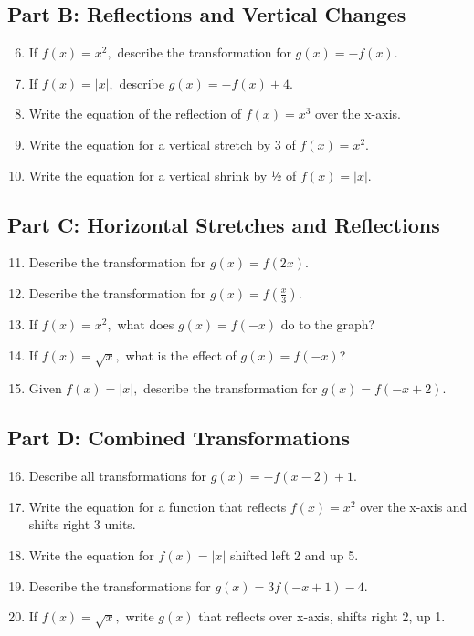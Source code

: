 \documentclass[12pt]{article}
\begin{document}
\subsection*{Part B: Reflections and Vertical Changes}
\begin{enumerate}
  \setcounter{enumi}{5}
  \item If \(f(x) = x^2,\) describe the transformation for \(g(x) = -f(x).\)
  \item If \(f(x) = |x|,\) describe \(g(x) = -f(x) + 4.\)
  \item Write the equation of the reflection of \(f(x) = x^3\) over the x-axis.
  \item Write the equation for a vertical stretch by 3 of \(f(x) = x^2.\)
  \item Write the equation for a vertical shrink by ½ of \(f(x) = |x|.\)
\end{enumerate}

\subsection*{Part C: Horizontal Stretches and Reflections}
\begin{enumerate}
  \setcounter{enumi}{10}
  \item Describe the transformation for \(g(x) = f(2x)\).
  \item Describe the transformation for \(g(x) = f\left(\frac{x}{3}\right)\).
  \item If \(f(x) = x^2,\) what does \(g(x) = f(-x)\) do to the graph?
  \item If \(f(x) = \sqrt{x},\) what is the effect of \(g(x) = f(-x)\)?
  \item Given \(f(x) = |x|,\) describe the transformation for \(g(x) = f(-x + 2)\).
\end{enumerate}

\subsection*{Part D: Combined Transformations}
\begin{enumerate}
  \setcounter{enumi}{15}
  \item Describe all transformations for \(g(x) = -f(x - 2) + 1.\)
  \item Write the equation for a function that reflects \(f(x) = x^2\) over the x-axis and shifts right 3 units.
  \item Write the equation for \(f(x) = |x|\) shifted left 2 and up 5.
  \item Describe the transformations for \(g(x) = 3f(-x + 1) - 4.\)
  \item If \(f(x) = \sqrt{x},\) write \(g(x)\) that reflects over x-axis, shifts right 2, up 1.
\end{enumerate}
\end{document}
